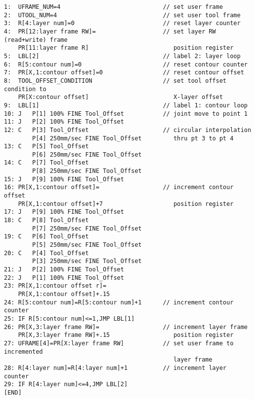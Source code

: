 \begin{verbatim}
1:  UFRAME_NUM=4                             // set user frame
2:  UTOOL_NUM=4                              // set user tool frame
3:  R[4:layer num]=0                         // reset layer counter
4:  PR[12:layer frame RW]=                   // set layer RW (read+write) frame 
    PR[11:layer frame R]                        position register   
5:  LBL[2]                                   // label 2: layer loop
6:  R[5:contour num]=0                       // reset contour counter
7:  PR[X,1:contour offset]=0                 // reset contour offset
8:  TOOL_OFFSET_CONDITION                    // set tool offset condition to  
    PR[X:contour offset]                        X-layer offset
9:  LBL[1]                                   // label 1: contour loop
10: J   P[1] 100% FINE Tool_Offset           // joint move to point 1
11: J   P[2] 100% FINE Tool_Offset
12: C   P[3] Tool_Offset                     // circular interpolation 
        P[4] 250mm/sec FINE Tool_Offset         thru pt 3 to pt 4
13: C   P[5] Tool_Offset
        P[6] 250mm/sec FINE Tool_Offset
14: C   P[7] Tool_Offset
        P[8] 250mm/sec FINE Tool_Offset
15: J   P[9] 100% FINE Tool_Offset
16: PR[X,1:contour offset]=                  // increment contour offset 
    PR[X,1:contour offset]+7                    position register
17: J   P[9] 100% FINE Tool_Offset
18: C   P[8] Tool_Offset
        P[7] 250mm/sec FINE Tool_Offset
19: C   P[6] Tool_Offset
        P[5] 250mm/sec FINE Tool_Offset
20: C   P[4] Tool_Offset
        P[3] 250mm/sec FINE Tool_Offset
21: J   P[2] 100% FINE Tool_Offset
22: J   P[1] 100% FINE Tool_Offset
23: PR[X,1:contour offset r]=
    PR[X,1:contour offset]+.15
24: R[5:contour num]=R[5:contour num]+1      // increment contour counter
25: IF R[5:contour num]<=1,JMP LBL[1]
26: PR[X,3:layer frame RW]=                  // increment layer frame 
    PR[X,3:layer frame RW]+.15                  position register
27: UFRAME[4]=PR[X:layer frame RW]           // set user frame to incremented 
                                                layer frame
28: R[4:layer num]=R[4:layer num]+1          // increment layer counter
29: IF R[4:layer num]<=4,JMP LBL[2]
[END]
\end{verbatim}
